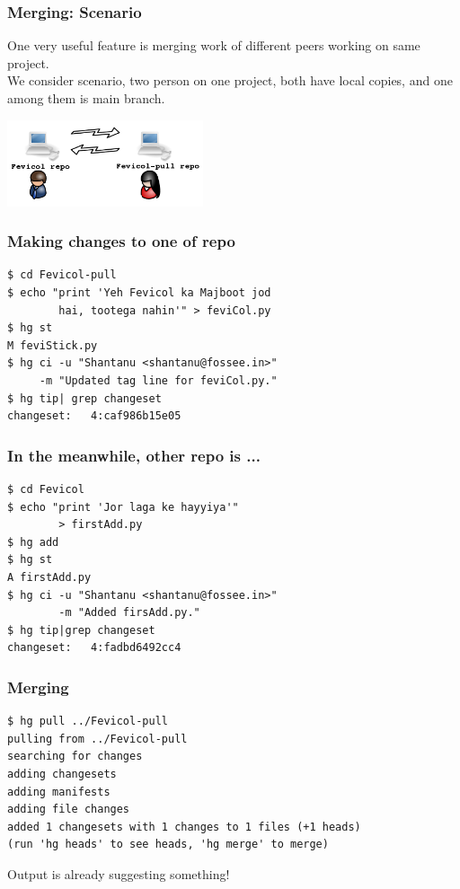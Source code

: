\documentclass[14pt,compress]{beamer}
\begin{document}
\begin{frame}[fragile]
  \frametitle{Merging: Scenario}
  One very useful feature is merging work of different peers working on same project.\\
  We consider scenario, two person on one project, both have local copies, and one among them is main branch.\\
  \begin{center}
    \includegraphics[height=1in, interpolate=true]{scenario}
  \end{center}  
\end{frame}


\begin{frame}[fragile]
  \frametitle{Making changes to one of repo}
  \begin{lstlisting}
$ cd Fevicol-pull
$ echo "print 'Yeh Fevicol ka Majboot jod 
        hai, tootega nahin'" > feviCol.py
$ hg st
M feviStick.py
$ hg ci -u "Shantanu <shantanu@fossee.in>" 
     -m "Updated tag line for feviCol.py."
$ hg tip| grep changeset
changeset:   4:caf986b15e05
  \end{lstlisting} %
\end{frame}

\begin{frame}[fragile]
  \frametitle{In the meanwhile, other repo is ...}
  \begin{lstlisting}
$ cd Fevicol
$ echo "print 'Jor laga ke hayyiya'" 
        > firstAdd.py
$ hg add 
$ hg st
A firstAdd.py
$ hg ci -u "Shantanu <shantanu@fossee.in>"
        -m "Added firsAdd.py."
$ hg tip|grep changeset
changeset:   4:fadbd6492cc4    
  \end{lstlisting}
\end{frame}

\begin{frame}[fragile]
  \frametitle{Merging}
  \begin{lstlisting}
$ hg pull ../Fevicol-pull
pulling from ../Fevicol-pull
searching for changes
adding changesets
adding manifests
adding file changes
added 1 changesets with 1 changes to 1 files (+1 heads)
(run 'hg heads' to see heads, 'hg merge' to merge)    
  \end{lstlisting} %
  Output is already suggesting something!
\end{frame}
\end{document}

